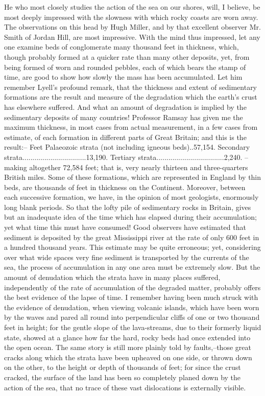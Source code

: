 He who most closely studies the action of the sea on our shores, will, I believe, be most deeply impressed with the slowness with which rocky coasts are worn away. The observations on this head by Hugh Miller, and by that excellent observer Mr. Smith of Jordan Hill, are most impressive. With the mind thus impressed, let any one examine beds of conglomerate many thousand feet in thickness, which, though probably formed at a quicker rate than many other deposits, yet, from being formed of worn and rounded pebbles, each of which bears the stamp of time, are good to show how slowly the mass has been accumulated. Let him remember Lyell's profound remark, that the thickness and extent of sedimentary formations are the result and measure of the degradation which the earth's crust has elsewhere suffered. And what an amount of degradation is implied by the sedimentary deposits of many countries! Professor Ramsay has given me the maximum thickness, in most cases from actual measurement, in a few cases from estimate, of each formation in different parts of Great Britain; and this is the result:--
Feet Palaeozoic strata (not including igneous beds)..57,154. Secondary strata................................13,190. Tertiary strata..................................2,240.
--making altogether 72,584 feet; that is, very nearly thirteen and three-quarters British miles. Some of these formations, which are represented in England by thin beds, are thousands of feet in thickness on the Continent. Moreover, between each successive formation, we have, in the opinion of most geologists, enormously long blank periods. So that the lofty pile of sedimentary rocks in Britain, gives but an inadequate idea of the time which has elapsed during their accumulation; yet what time this must have consumed! Good observers have estimated that sediment is deposited by the great Mississippi river at the rate of only 600 feet in a hundred thousand years. This estimate may be quite erroneous; yet, considering over what wide spaces very fine sediment is transported by the currents of the sea, the process of accumulation in any one area must be extremely slow.
But the amount of denudation which the strata have in many places suffered, independently of the rate of accumulation of the degraded matter, probably offers the best evidence of the lapse of time. I remember having been much struck with the evidence of denudation, when viewing volcanic islands, which have been worn by the waves and pared all round into perpendicular cliffs of one or two thousand feet in height; for the gentle slope of the lava-streams, due to their formerly liquid state, showed at a glance how far the hard, rocky beds had once extended into the open ocean. The same story is still more plainly told by faults,--those great cracks along which the strata have been upheaved on one side, or thrown down on the other, to the height or depth of thousands of feet; for since the crust cracked, the surface of the land has been so completely planed down by the action of the sea, that no trace of these vast dislocations is externally visible.
